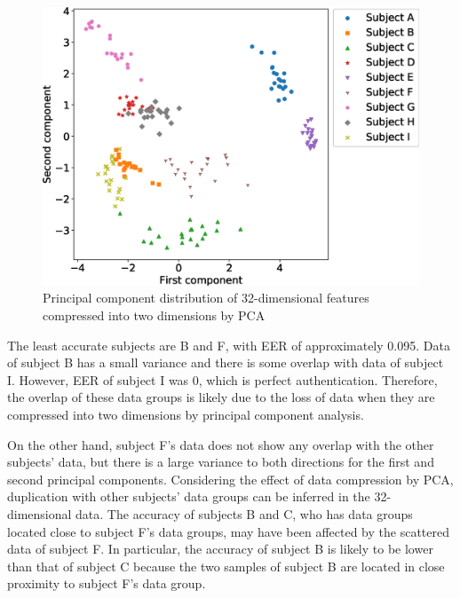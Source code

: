 \documentclass[sigchi,authordraft]{acmart}
\newcommand\figref[1]{\textbf{Figure~\ref{fig:#1}}}
\begin{document}

\begin{figure}[!t]
  \centering
    \includegraphics[width=1\linewidth]{figure/PCA.eps}
  \caption{Principal component distribution of 32-dimensional features compressed into two dimensions by PCA}
  \label{fig:PCA}
\end{figure}

The least accurate subjects are B and F, with EER of approximately 0.095. Data of subject B has a small variance and there is some overlap with data of subject I. However, EER of subject I was 0, which is perfect authentication. Therefore, the overlap of these data groups is likely due to the loss of data when they are compressed into two dimensions by principal component analysis. 

On the other hand, subject F's data does not show any overlap with the other subjects' data, but there is a large variance to both directions for the first and second principal components. Considering the effect of data compression by PCA, duplication with other subjects' data groups can be inferred in the 32-dimensional data. The accuracy of subjects B and C, who has data groups located close to subject F's data groups, may have been affected by the scattered data of subject F. In particular, the accuracy of subject B is likely to be lower than that of subject C because the two samples of subject B are located in close proximity to subject F's data group.\par
\end{document}

